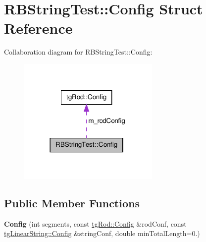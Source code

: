 \hypertarget{struct_r_b_string_test_1_1_config}{\section{R\-B\-String\-Test\-:\-:Config Struct Reference}
\label{struct_r_b_string_test_1_1_config}
}


Collaboration diagram for R\-B\-String\-Test\-:\-:Config\-:\nopagebreak
\begin{figure}[H]
\begin{center}
\leavevmode
\includegraphics[width=194pt]{struct_r_b_string_test_1_1_config__coll__graph}
\end{center}
\end{figure}
\subsection*{Public Member Functions}
\begin{DoxyCompactItemize}
\item 
\hypertarget{struct_r_b_string_test_1_1_config_a00f03b2c4223e1d803ffe5a1e7af0f86}{{\bfseries Config} (int segments, const \hyperlink{structtg_rod_1_1_config}{tg\-Rod\-::\-Config} \&rod\-Conf, const \hyperlink{structtg_base_string_1_1_config}{tg\-Linear\-String\-::\-Config} \&string\-Conf, double min\-Total\-Length=0.)}\label{struct_r_b_string_test_1_1_config_a00f03b2c4223e1d803ffe5a1e7af0f86}

\end{DoxyCompactItemize}
